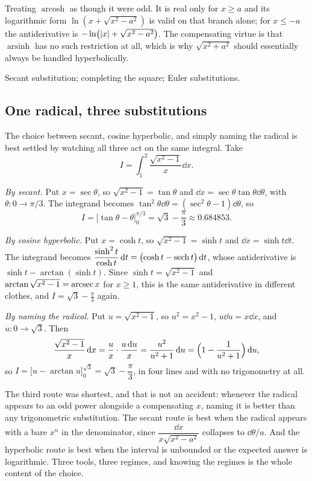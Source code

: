 \begin{trap}
Treating $\operatorname{arcosh}$ as though it were odd. It is real only for $x\geq a$ and its logarithmic form $\ln(x+\sqrt{x^2-a^2})$ is valid on that branch alone; for $x\leq-a$ the antiderivative is $-\ln\bigl(\left\lvert x\right\rvert+\sqrt{x^2-a^2}\bigr)$. The compensating virtue is that $\operatorname{arsinh}$ has no such restriction at all, which is why $\sqrt{x^2+a^2}$ should essentially always be handled hyperbolically.
\end{trap}

\begin{seealsob}Secant substitution; completing the square; Euler substitutions.\end{seealsob}

\subsection{One radical, three substitutions}

The choice between secant, cosine hyperbolic, and simply naming the radical is best settled by watching all three act on the same integral. Take
\[
I=\int_1^2\frac{\sqrt{x^2-1}}{x}\dd x .
\]

\emph{By secant.} Put $x=\sec\theta$, so $\sqrt{x^2-1}=\tan\theta$ and $\dd x=\sec\theta\tan\theta\dd\theta$, with $\theta:0\to\pi/3$. The integrand becomes $\tan^2\theta\dd\theta=(\sec^2\theta-1)\dd\theta$, so
\[
I=\bigl[\tan\theta-\theta\bigr]_0^{\pi/3}=\sqrt3-\frac{\pi}{3}\approx0.684853 .
\]

\emph{By cosine hyperbolic.} Put $x=\cosh t$, so $\sqrt{x^2-1}=\sinh t$ and $\dd x=\sinh t\dd t$. The integrand becomes $\dfrac{\sinh^2t}{\cosh t}\,\mathrm{d} t=\bigl(\cosh t-\operatorname{sech} t\bigr)\,\mathrm{d} t$, whose antiderivative is $\sinh t-\arctan(\sinh t)$. Since $\sinh t=\sqrt{x^2-1}$ and $\arctan\sqrt{x^2-1}=\operatorname{arcsec} x$ for $x\geq1$, this is the same antiderivative in different clothes, and $I=\sqrt3-\tfrac\pi3$ again.

\emph{By naming the radical.} Put $u=\sqrt{x^2-1}$, so $u^2=x^2-1$, $u\dd u=x\dd x$, and $u:0\to\sqrt3$. Then
\[
\frac{\sqrt{x^2-1}}{x}\,\mathrm{d} x=\frac ux\cdot\frac{u\,\mathrm{d} u}{x}=\frac{u^2}{u^2+1}\,\mathrm{d} u=\Bigl(1-\frac{1}{u^2+1}\Bigr)\,\mathrm{d} u ,
\]
so $I=\bigl[u-\arctan u\bigr]_0^{\sqrt3}=\sqrt3-\dfrac{\pi}{3}$, in four lines and with no trigonometry at all.

The third route was shortest, and that is not an accident: whenever the radical appears to an odd power alongside a compensating $x$, naming it is better than any trigonometric substitution. The secant route is best when the radical appears with a bare $x^n$ in the denominator, since $\dfrac{\dd x}{x\sqrt{x^2-a^2}}$ collapses to $\dd\theta/a$. And the hyperbolic route is best when the interval is unbounded or the expected answer is logarithmic. Three tools, three regimes, and knowing the regimes is the whole content of the choice.

